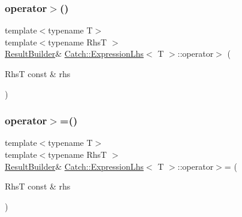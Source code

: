 \subsubsection{\texorpdfstring{operator$>$()}{operator>()}}
{\footnotesize\ttfamily template$<$typename T$>$ \\
template$<$typename RhsT $>$ \\
\hyperlink{class_catch_1_1_result_builder}{Result\+Builder}\& \hyperlink{class_catch_1_1_expression_lhs}{Catch\+::\+Expression\+Lhs}$<$ T $>$\+::operator$>$ (\begin{DoxyParamCaption}\item[{RhsT const \&}]{rhs }\end{DoxyParamCaption})\hspace{0.3cm}{\ttfamily [inline]}}

\hypertarget{class_catch_1_1_expression_lhs_a21d30d6026ff2b1f86ddbd6b0a90d036}{}\label{class_catch_1_1_expression_lhs_a21d30d6026ff2b1f86ddbd6b0a90d036} 
\subsubsection{\texorpdfstring{operator$>$=()}{operator>=()}}
{\footnotesize\ttfamily template$<$typename T$>$ \\
template$<$typename RhsT $>$ \\
\hyperlink{class_catch_1_1_result_builder}{Result\+Builder}\& \hyperlink{class_catch_1_1_expression_lhs}{Catch\+::\+Expression\+Lhs}$<$ T $>$\+::operator$>$= (\begin{DoxyParamCaption}\item[{RhsT const \&}]{rhs }\end{DoxyParamCaption})\hspace{0.3cm}{\ttfamily [inline]}}

\hypertarget{class_catch_1_1_expression_lhs_a6932b72da79d6c6b03d867772ceac61b}{}\label{class_catch_1_1_expression_lhs_a6932b72da79d6c6b03d867772ceac61b} 
